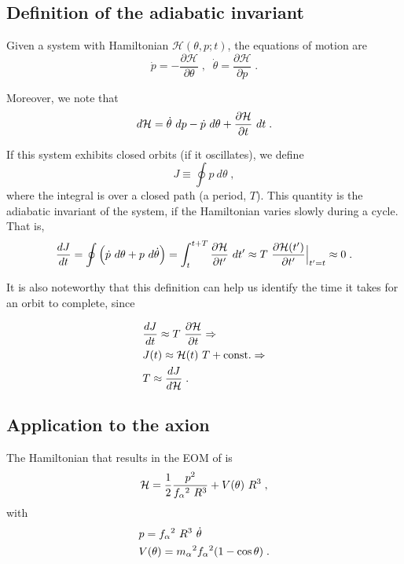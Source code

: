 \documentclass[11pt,a4paper]{article}
\begin{document}
\subsection*{Definition of the adiabatic invariant}
%
Given a system with Hamiltonian $\mathcal{H}(\theta,p;t)$, the equations of motion are 
%
\begin{equation}
	\dot p = - \dfrac{\partial \mathcal{H}}{\partial \theta} \;, \;\; 
	\dot \theta =  \dfrac{\partial \mathcal{H}}{\partial p} \;.
	\label{eq:hamiltonian_eoms}
\end{equation}

Moreover, we note that
%
\begin{equation}
	d \mathcal{H} = \dot \theta \ d p - \dot p \ d \theta + \dfrac{\partial \mathcal{H}}{\partial t} \ d t \;.  
	\label{eq:total_dH}
\end{equation}


If this system exhibits closed orbits (\eg if it oscillates), we define 
%
\begin{equation}
	J \equiv \oint p \ d \theta \;,
	\label{eq:adiabatic_inv_def}
\end{equation}
%
where the integral is over a closed path (\eg a period, $T$). This quantity is the adiabatic invariant of the system, if the Hamiltonian varies slowly during a cycle. That is,
%
\[
	\dfrac{d J}{d t} =  \oint \Big( \dot p \ d \theta + p \ d \dot \theta \Big) = \displaystyle \int_{t}^{t+T}  \dfrac{\partial \mathcal{H}}{\partial t^\prime} \ d t^\prime \approx T \ \dfrac{\partial \mathcal{H}(t^{\prime})}{\partial t^{\prime}}\Big|_{t^{\prime}=t} \approx 0 
	\;. 
\]
%

It is also noteworthy that this definition can help us identify the time it takes for an orbit to complete, since 
%

\begin{eqnarray}
	&\dfrac{d J}{d t} \approx  T \ \dfrac{\partial \mathcal{H}}{\partial t} \Rightarrow \nonumber \\
	&J(t) \approx \mathcal{H}(t) \ T + {\rm const.} \Rightarrow \nonumber \\
	&T \approx \dfrac{d J}{d \mathcal{H}} \;.  \nonumber 
\end{eqnarray}

\subsection*{Application to the axion}
%
The Hamiltonian that results in the EOM of  is
%
\begin{equation}
	\mathcal{H} = \dfrac{1}{2} \dfrac{p^2}{f_{\alpha}{}^2 \ R^3} + V(\theta) \ R^3\;,
	\label{eq:axion_H}
\end{equation}
%
with 
%
\begin{eqnarray}
	& p = f_{\alpha}{}^2 \ R^3 \ \dot \theta \\
	\label{eq:momentum}
	& V(\theta) = m_\alpha{}^2 f_{\alpha}{}^2 (1-\cos \theta) \;.
	\label{eq:potential}
\end{eqnarray}
\end{document}

